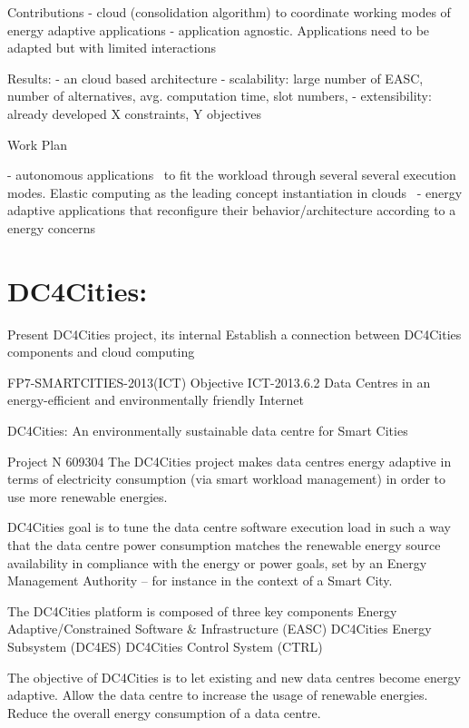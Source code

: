 Contributions
- cloud (consolidation algorithm) to coordinate working modes of energy adaptive applications
- application agnostic. Applications need to be adapted but with limited interactions
	
Results:
- an cloud based architecture
- scalability:  large number of EASC, number of alternatives, avg. computation time, slot numbers, 
- extensibility: already developed X constraints, Y objectives
 
Work Plan

- autonomous applications~\cite{kephart-computer2003} to fit the workload through several several execution modes. Elastic computing as the leading concept instantiation in clouds~\cite{x}
- energy adaptive applications that reconfigure their behavior/architecture  according to a energy concerns~\cite{energy-adaptive-apps-OSR12, others}


\section{DC4Cities:}
Present DC4Cities project, its internal
Establish a connection between DC4Cities components and cloud computing

FP7-SMARTCITIES-2013(ICT)
Objective ICT-2013.6.2 
Data Centres in an energy-efficient and environmentally friendly Internet

DC4Cities: An environmentally sustainable data centre for Smart Cities

Project N 609304
The DC4Cities project makes data centres energy adaptive in terms of electricity consumption (via smart workload management) in order to use more renewable energies.

DC4Cities goal is to tune the data centre software execution load in such a way that the data centre power consumption matches the renewable energy source availability in compliance with the energy or power goals, set by an Energy Management Authority – for instance in the context of a Smart City.

The DC4Cities platform is composed of three key components
Energy Adaptive/Constrained Software & Infrastructure (EASC)
DC4Cities Energy Subsystem (DC4ES) 
DC4Cities Control System (CTRL)

The objective of DC4Cities is to let existing and new data centres become energy adaptive. 
Allow the data centre to increase the usage of renewable energies.
Reduce the overall energy consumption of a data centre.

